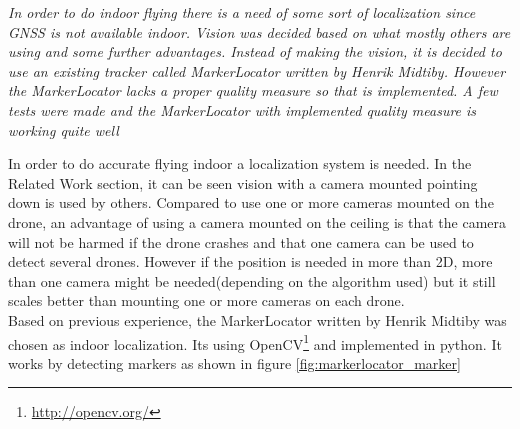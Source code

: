 \textit{In order to do indoor flying there is a need of some sort of localization since GNSS is not available indoor. Vision was decided based on what mostly others are using and some further advantages. Instead of making the vision, it is decided to use an existing tracker called MarkerLocator written by Henrik Midtiby. However the MarkerLocator lacks a proper quality measure so that is implemented. A few tests were made and the MarkerLocator with implemented quality measure is working quite well}


In order to do accurate flying indoor a localization system is needed. In the Related Work section, it can be seen vision with a camera mounted pointing down is used by others. Compared to use one or more cameras mounted on the drone, an advantage of using a camera mounted on the ceiling is that the camera will not be harmed if the drone crashes and that one camera can be used to detect several drones. However if the position is needed in more than 2D, more than one camera might be needed(depending on the algorithm used) but it still scales better than mounting one or more cameras on each drone. \\

Based on previous experience, the MarkerLocator written by Henrik Midtiby was chosen as indoor localization. Its using OpenCV\footnote{\url{http://opencv.org/}} and implemented in python. It works by detecting markers as shown in figure \ref{fig:markerlocator_marker}



